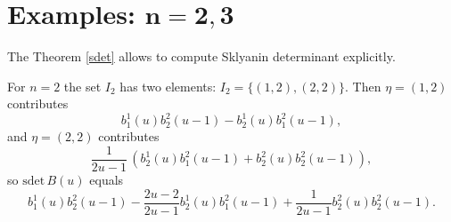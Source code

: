 \documentclass[pdftex]{sigma}
\begin{document}
\section[Examples: $n=2,  3$]{Examples: $\boldsymbol{n=2,  3}$}\label{section5}

The Theorem \ref{sdet} allows to compute Sklyanin determinant explicitly.
\begin{example}
For $n=2$ the set $I_2$ has two elements: $I_2=\{(1,2), (2,2)\}$. Then
  $\eta=(1,2)$ contributes
  \[
  b_1^{1}(u)b_2^{2}(u-1) - b_2^{1}(u)b_1^{2}(u-1),
  \]
  and $\eta=(2,2)$ contributes
\[
\frac{1}{2u-1}\,(b_2^{1}(u)b_1^{2}(u-1)
+
b_2^{2}(u)b_2^{2}(u-1)),
\]
 so $\text{sdet}\,B(u)$ equals
\[
 b_1^{1}(u)b_2^{2}(u-1) - \frac{2u-2}{2u-1}b_2^{1}(u)b_1^{2}(u-1) + \frac{1}{2u-1}b_2^{2}(u)b_2^{2}(u-1).
 \]
 \end{example}
\end{document}
